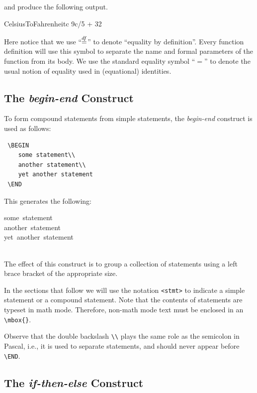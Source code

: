 \documentclass[a4]{article}
\begin{document}
\noindent{}and produce the following output.

\begin{pseudocode}{CelsiusToFahrenheit}{c}
  {9c/5} + 32
\end{pseudocode}

Here notice that we use ``$\stackrel{df}{=}$'' to denote ``equality by
definition''.  Every function definition will use this symbol to
separate the name and formal parameters of the function from its
body. We use the standard equality symbol ``$=$'' to denote the
usual notion of equality used in (equational) identities.

\subsection{ The {\em begin-end} Construct}

To form compound statements from simple statements, the {\em begin-end} 
construct is used as follows:
\begin{verbatim}
 \BEGIN
    some statement\\
    another statement\\
    yet another statement
 \END 
\end{verbatim}
This generates the following:

\medskip
\begin{pseudocode}[display]{}{}
\BEGIN
\mbox{some statement}\\
\mbox{another statement}\\
\mbox{yet another statement}
\END
\end{pseudocode}
\\[2ex]
\noindent{}The effect of this construct is to group 
a collection of statements
using a left brace bracket of the appropriate size.

In the sections that follow we will use the notation
\verb+<stmt>+
to indicate  a simple statement or a compound statement.
Note that the contents of statements are typeset in math mode.
Therefore, non-math mode text must be enclosed in an
\verb+\mbox{}+.

Observe that the double backslash \verb+\\+ plays the same
role as the semicolon in Pascal, i.e., it is used to
separate statements, and should never appear before
\verb+\END+.

\subsection{The {\em if-then-else} Construct}
\end{document}
